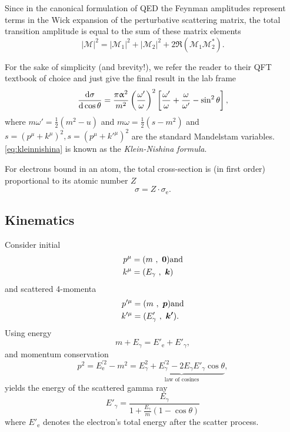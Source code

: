 Since in the canonical formulation of QED the Feynman amplitudes represent terms in the Wick expansion of the perturbative scattering matrix, the total transition amplitude is equal to the sum of these matrix elements
\begin{equation*}
	|\mathcal{M}|^2 = |\mathcal{M}_1|^2 + |\mathcal{M}_2|^2 + 2\Re\left(\mathcal{M}_1\mathcal{M}_2^*\right).
\end{equation*}

For the sake of simplicity (and brevity!), we refer the reader to their QFT textbook of choice and just give the final result in the lab frame
\begin{equation}\label{eq:kleinnishina}
	\frac{\text{d}\sigma}{\text{d}\cos\theta} = \frac{\pi\upalpha^2}{m^2}\left(\frac{\omega'}{\omega}\right)^2\left[\frac{\omega'}{\omega} + \frac{\omega}{\omega'} - \sin^2\theta\right],
\end{equation}
where $m\omega' = \frac{1}{2}\left(m^2-u\right)$ and $m\omega = \frac{1}{2}\left(s-m^2\right)$ and $s=\left(p^\mu + k^\mu\right)^2, s=\left(p^\mu + k'^\mu\right)^2$ are the standard Mandelstam variables.
\autoref{eq:kleinnishina} is known as the \textit{Klein-Nishina formula}.

For electrons bound in an atom, the total cross-section is (in first order) proportional to its atomic number $Z$
\begin{equation*}
	\sigma = Z\cdot\sigma_\text{e}.
\end{equation*}
\subsection{Kinematics}
Consider initial
\begin{align*}
	p^\mu &= (m\ ,\ \boldsymbol{0}) \text{and}\\
	k^\mu &= (E_\gamma\ ,\ \boldsymbol{k})
\end{align*}
and scattered 4-momenta
\begin{align*}
	p'^\mu &= (m\ ,\ \boldsymbol{p}) \text{and}\\
	k'^\mu &= (E'_\gamma\ ,\ \boldsymbol{k'}).
\end{align*}
Using energy
\begin{equation*}
	m + E_\gamma = E'_\text{e} + E'_\gamma,
\end{equation*}
and momentum conservation
\begin{equation*}
	p^2 = E_\text{e}^{'2} - m^2 = \underbrace{E_\gamma^2 + E_\gamma^{'2} - 2E_\gamma E'_\gamma\cos\theta}_\text{law of cosines},
\end{equation*}
yields the energy of the scattered gamma ray
\begin{equation*}
	E'_\gamma = \frac{E_\gamma}{1 + \frac{E_\gamma}{m}\left(1 - \cos\theta\right)}
\end{equation*}
where $E'_\text{e}$ denotes the electron's total energy after the scatter process.
